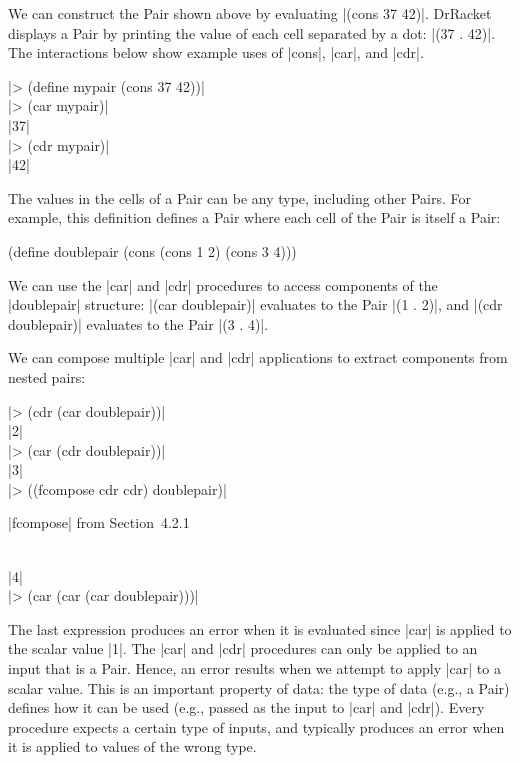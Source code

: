 \begin{schemeregion}
We can construct the Pair shown above by evaluating \scheme|(cons 37 42)|.  DrRacket displays a Pair by printing the value of each cell separated by a dot: \schemeresult|(37 . 42)|.  The interactions below show example uses of \scheme|cons|, \scheme|car|, and \scheme|cdr|.

\begin{code}
\scheme|> (define mypair (cons 37 42))|\\
\scheme|> (car mypair)|\\
\schemeresult|37|\\
\scheme|> (cdr mypair)|\\
\schemeresult|42|
\end{code}

The values in the cells of a Pair can be any type, including other Pairs.  For example, this definition defines a Pair where each cell of the Pair is itself a Pair:
\begin{schemedisplay}
(define doublepair (cons (cons 1 2) (cons 3 4)))
\end{schemedisplay}

We can use the \scheme|car| and \scheme|cdr| procedures to access components of the \scheme|doublepair| structure: \scheme|(car doublepair)| evaluates to the Pair \schemeresult|(1 . 2)|, and \scheme|(cdr doublepair)| evaluates to the Pair \schemeresult|(3 . 4)|.

We can compose multiple \scheme|car| and \scheme|cdr| applications to extract components from nested pairs:

\begin{code}
\scheme|> (cdr (car doublepair))|\\
\schemeresult|2|\\
\scheme|> (car (cdr doublepair))|\\
\schemeresult|3|\\
\scheme|> ((fcompose cdr cdr) doublepair)|\begin{scaside}\scheme|fcompose| from Section~4.2.1\end{scaside}\\ %
\schemeresult|4|\\
\scheme|> (car (car (car doublepair)))|\\
\end{code}

The last expression produces an error when it is evaluated since \scheme|car| is applied to the scalar value \scheme|1|.  The \scheme|car| and \scheme|cdr| procedures can only be applied to an input that is a Pair.  Hence, an error results when we attempt to apply \scheme|car| to a scalar value.  This is an important property of data: the type of data (e.g., a Pair) defines how it can be used (e.g., passed as the input to \scheme|car| and \scheme|cdr|).  Every procedure expects a certain type of inputs, and typically produces an error when it is applied to values of the wrong type.


\end{schemeregion}
